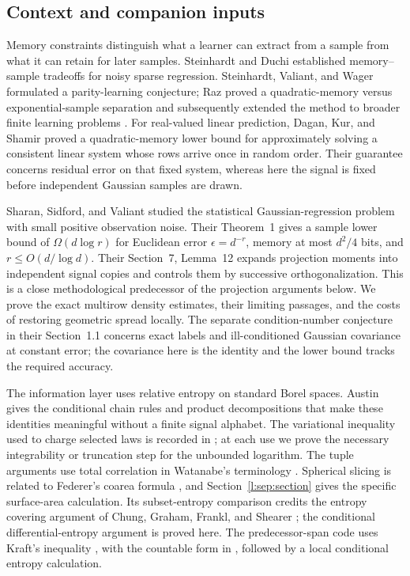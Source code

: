 \subsection{Context and companion inputs}

Memory constraints distinguish what a learner can extract from a sample
from what it can retain for later samples. Steinhardt and Duchi
\cite{SteinhardtDuchi2015} established memory--sample tradeoffs for noisy
sparse regression. Steinhardt, Valiant, and Wager
\cite{SteinhardtValiantWager2016} formulated a parity-learning conjecture;
Raz \cite{Raz2016} proved a quadratic-memory versus exponential-sample
separation and subsequently extended the method to broader finite
learning problems \cite{Raz2017}. For real-valued linear prediction,
Dagan, Kur, and Shamir \cite[Section~3.3, Theorem~10]{DaganKurShamir2019}
proved a quadratic-memory lower bound for approximately solving a
consistent linear system whose rows arrive once in random order.
Their guarantee concerns residual error on that fixed system, whereas
here the signal is fixed before independent Gaussian samples are drawn.

Sharan, Sidford, and Valiant \cite{SSV2019} studied the statistical
Gaussian-regression problem with small positive observation noise.
Their Theorem~1 gives a sample lower bound of \(\Omega(d\log r)\)
for Euclidean error \(\epsilon=d^{-r}\), memory at most \(d^2/4\)
bits, and \(r\le O(d/\log d)\). Their Section~7, Lemma~12 expands
projection moments into independent signal copies and controls them
by successive orthogonalization. This is a close methodological
predecessor of the projection arguments below. We prove the exact
multirow density estimates, their limiting passages, and the costs
of restoring geometric spread locally. The separate condition-number
conjecture in their Section~1.1 concerns exact labels and
ill-conditioned Gaussian covariance at constant error; the covariance
here is the identity and the lower bound tracks the required accuracy.

The information layer uses relative entropy on standard Borel spaces.
Austin \cite{Austin2020} gives the conditional chain rules and
product decompositions that make these identities meaningful without
a finite signal alphabet. The variational inequality used to charge
selected laws is recorded in \cite{DupuisMao2022}; at each use we
prove the necessary integrability or truncation step for the
unbounded logarithm. The tuple arguments use total correlation in
Watanabe's terminology \cite{Watanabe1960}. Spherical slicing is
related to Federer's coarea formula \cite{Federer1959}, and
Section~\ref{l:sep:section} gives the specific surface-area
calculation. Its subset-entropy comparison credits the entropy
covering argument of Chung, Graham, Frankl, and Shearer
\cite{ChungGrahamFranklShearer1986}; the conditional
differential-entropy argument is proved here. The predecessor-span
code uses Kraft's inequality \cite{Kraft1949}, with the countable
form in \cite[Theorem~2.4.2]{Duchi2023}, followed by a local
conditional entropy calculation.

